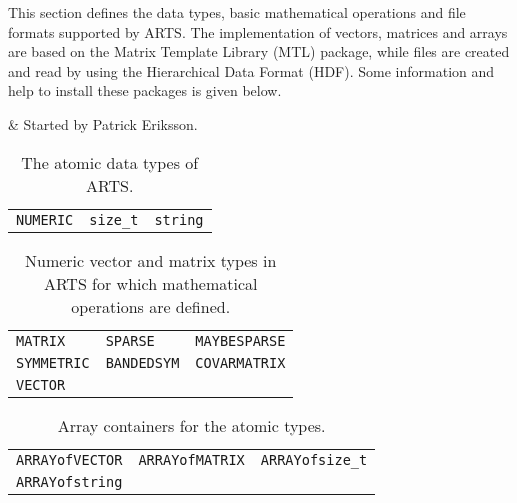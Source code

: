 %
%
 \label{sec:formats}
 
 This section defines the data types, basic mathematical operations
 and file formats supported by ARTS. The implementation of vectors,
 matrices and arrays are based on the Matrix Template Library (MTL)
 package, while files are created and read by using the Hierarchical
 Data Format (HDF). Some information and help to install these packages
 is given below.

%
%
 & Started by Patrick Eriksson. \\
\stophistory


 \label{sec:formats:datatypes}

 \begin{table}[t]
  \begin{tabular}{p{4.5cm} p{4.5cm} p{4.5cm}}
   \verb|NUMERIC|        & \verb|size_t|         & \verb|string|         \\
  \end{tabular}
  \caption{The atomic data types of ARTS.}
  \label{table:format:atomic}
 \end{table}

 \begin{table}[t]
  \begin{tabular}{p{4.5cm} p{4.5cm} p{4.5cm}}
   \verb|MATRIX|         & \verb|SPARSE|         & \verb|MAYBESPARSE|    \\
   \verb|SYMMETRIC|      & \verb|BANDEDSYM|      & \verb|COVARMATRIX|    \\
   \verb|VECTOR|         &                       &                       \\
  \end{tabular}
  \caption{Numeric vector and matrix types in ARTS for which mathematical 
           operations are defined.}
  \label{table:format:nummath}
 \end{table}

 \begin{table}[t]
  \begin{tabular}{p{4.5cm} p{4.5cm} p{4.5cm}}
   \verb|ARRAYofVECTOR|  & \verb|ARRAYofMATRIX|  & \verb|ARRAYofsize_t|   \\
   \verb|ARRAYofstring|  &                       &                        \\
  \end{tabular}
  \caption{Array containers for the atomic types.}
  \label{table:format:atomicarrays}
 \end{table}

